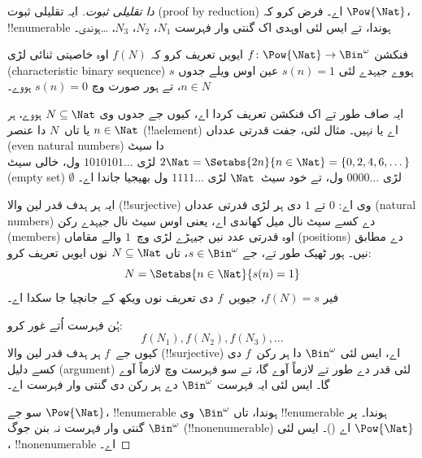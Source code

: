 \documentclass[../../../include/open-logic-section]{subfiles}
\begin{document}
\begin{proof}[{} دا تقلیلی ثبوت]
ایہ تقلیلی ثبوت (proof by reduction) اے۔ فرض کرو کہ $\Pow{\Nat}$،
!!{enumerable} ہوندا، تے ایس لئی اوہدی اک گنتی وار فہرست $N_{1}$،
$N_{2}$، $N_{3}$، \dots ہوندی۔

فنکشن $f \colon \Pow{\Nat} \to \Bin^\omega$ ایویں تعریف کرو کہ
$f(N)$ اوہ خاصیتی ثنائی لڑی (characteristic binary sequence) $s$
ہووے جیہدے لئی $s(n) = 1$ عین اوس ویلے جدوں $n \in N$، تے ہور
صورت وچ $s(n) = 0$ ہووے۔

ایہ صاف طور تے اک فنکشن تعریف کردا اے، کیوں جے جدوں وی
$N \subseteq \Nat$ ہووے، ہر $n \in \Nat$ یا تاں~$N$ دا عنصر
(!!a{element}) اے یا نہیں۔ مثال لئی، جفت قدرتی عدداں (even natural
numbers) دا سیٹ
$2\Nat = \Setabs{2n}{n \in \Nat} = \{0,2, 4, 6,
\dots\}$ لڑی $1010101\dots$ ول، خالی سیٹ (empty set) $\emptyset$
لڑی $0000\dots$ ول، تے خود سیٹ~$\Nat$ لڑی $1111\dots$ ول بھیجیا
جاندا اے۔

ایہ ہر ہدف قدر لین والا (!!{surjective}) وی اے: $0$ تے $1$ دی ہر
لڑی قدرتی عدداں (natural numbers) دے کسے سیٹ نال میل کھاندی اے، یعنی
اوس سیٹ نال جیہدے رکن (members) اوہ قدرتی عدد نیں جیہڑے لڑی وچ~$1$
والے مقاماں (positions) دے مطابق نیں۔ ہور ٹھیک طور تے، جے
$s \in \Bin^\omega$، تاں $N \subseteq \Nat$ نوں ایویں تعریف کرو:
\[
N = \Setabs{n \in \Nat}{s(n) = 1}
\]
فیر $f(N) = s$، جیویں~$f$ دی تعریف نوں ویکھ کے جانچیا جا سکدا اے۔

ہُن فہرست اُتے غور کرو:
\[
f(N_1), f(N_2), f(N_3), \dots
\]
کیوں جے~$f$ ہر ہدف قدر لین والا (!!{surjective}) اے، ایس لئی
$\Bin^\omega$ دا ہر رکن~$f$ دی کسے دلیل (argument) لئی قدر دے طور
تے لازماً آوے گا، تے سو فہرست وچ لازماً آوے گا۔ ایس لئی ایہ فہرست
$\Bin^\omega$ دے ہر رکن دی گنتی وار فہرست اے۔

سو جے $\Pow{\Nat}$، !!{enumerable} ہوندا، تاں $\Bin^\omega$ وی
!!{enumerable} ہوندا۔ پر $\Bin^\omega$ گنتی وار فہرست نہ بنن جوگ
(!!{nonenumerable}) اے ()۔ ایس
لئی $\Pow{\Nat}$، !!{nonenumerable} اے۔
\end{proof}
\end{document}
